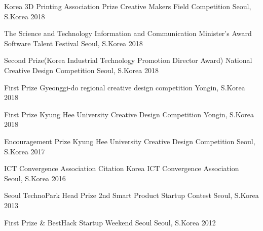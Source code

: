 

\begin{cvhonors}

  \cvhonor
    {Korea 3D Printing Association Prize} %
    {Creative Makers Field Competition} %
    {Seoul, S.Korea} %
    {2018} %

  \cvhonor
    {The Science and Technology Information and Communication Minister’s Award} %
    {Software Talent Festival} %
    {Seoul, S.Korea} %
    {2018} %
    
  \cvhonor
    {Second Prize(Korea Industrial Technology Promotion Director Award)} %
    {National Creative Design Competition} %
    {Seoul, S.Korea} %
    {2018} %
    
  \cvhonor
    {First Prize} %
    {Gyeonggi-do regional creative design competition} %
    {Yongin, S.Korea} %
    {2018} %

  \cvhonor
    {First Prize} %
    {Kyung Hee University Creative Design Competition} %
    {Yongin, S.Korea} %
    {2018} %
    
  \cvhonor
    {Encouragement Prize} %
    {Kyung Hee University Creative Design Competition} %
    {Seoul, S.Korea} %
    {2017} %
    
  \cvhonor
    {ICT Convergence Association Citation} %
    {Korea ICT Convergence Association} %
    {Seoul, S.Korea} %
    {2016} %
    
  \cvhonor
    {Seoul TechnoPark Head Prize} %
    {2nd Smart Product Startup Contest} %
    {Seoul, S.Korea} %
    {2013} %
    
  \cvhonor
    {First Prize \& BestHack} %
    {Startup Weekend Seoul} %
    {Seoul, S.Korea} %
    {2012} %
    
\end{cvhonors}
